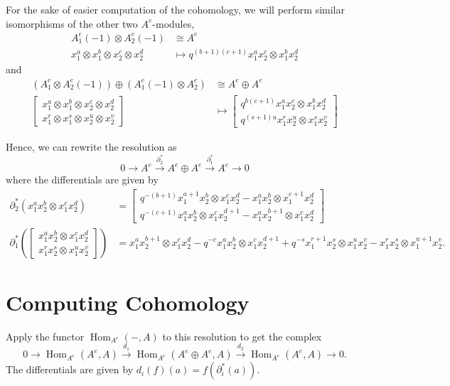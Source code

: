 \documentclass[12pt,a4paper]{article}
\DeclareMathOperator{\Hom}{Hom}
\newcommand\1{_{(1)}}
\newcommand\2{_{(2)}}
\begin{document}
For the sake of easier computation of the cohomology, we will perform similar isomorphisms of the other two $A^e$-modules,
\begin{align*}
A^e_1(-1)\otimes A^e_2(-1)&\cong A^e\\
x_1^a\otimes x_1^b\otimes x_2^c\otimes x_2^d&\mapsto q^{(b+1)(c+1)}x_1^ax_2^c\otimes x_1^bx_2^d
\end{align*}
and
\begin{align*}
\left(A^e_1\otimes A^e_2(-1)\right)\oplus\left(A^e_1(-1)\otimes A^e_2\right)&\cong A^e\oplus A^e\\
\begin{bmatrix} x_1^a\otimes x_1^b\otimes x_2^c\otimes x_2^d\\x_1^r\otimes x_1^s\otimes x_2^u\otimes x_2^v\end{bmatrix}&\mapsto\begin{bmatrix}q^{b(c+1)}x_1^ax_2^c\otimes x_1^bx_2^d\\q^{(s+1)u}x_1^rx_2^u\otimes x_1^sx_2^v \end{bmatrix}
\end{align*}

Hence, we can rewrite the resolution as
\[
0\to A^e\xrightarrow{\partial^*_2}A^e\oplus A^e\xrightarrow{\partial^*_1}A^e\to 0
\]
where the differentials are given by
\begin{align*}
\partial^*_2\left(x_1^ax_2^b\otimes x_1^cx_2^d\right)&=\begin{bmatrix}q^{-(b+1)}x_1^{a+1}x_2^b\otimes x_1^cx_2^d-x_1^ax_2^b\otimes x_1^{c+1}x_2^d\\q^{-(c+1)}x_1^ax_2^b\otimes x_1^cx_2^{d+1}-x_1^ax_2^{b+1}\otimes x_1^cx_2^d \end{bmatrix}\\
\partial^*_1\left(\begin{bmatrix}x_1^ax_2^b\otimes x_1^cx_2^d\\ x_1^rx_2^s\otimes x_1^ux_2^v\end{bmatrix}\right)&=x_1^ax_2^{b+1}\otimes x_1^cx_2^d-q^{-c}x_1^ax_2^b\otimes x_1^cx_2^{d+1}+q^{-s}x_1^{r+1}x_2^s\otimes x_1^ux_2^v-x_1^rx_2^s\otimes x_1^{u+1}x_2^v.
\end{align*}

\newpage

\section{Computing Cohomology}
Apply the functor $\Hom_{A^e}(-,A)$ to this resolution to get the complex
\[
0\to \Hom_{A^e}(A^e,A)\xrightarrow{d_1} \Hom_{A^e}(A^e\oplus A^e,A)\xrightarrow{d_2}\Hom_{A^e}(A^e,A)\to 0.  
\]
The differentials are given by $d_i(f)(a)=f(\partial_i^*(a))$.
\end{document}
